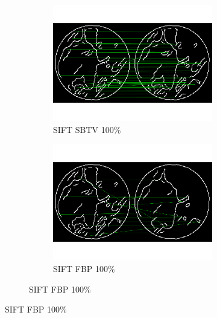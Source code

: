 \documentclass[10pt,a4paper,titlepage]{article}
\begin{document}
\begin{figure}
	\begin{figure}[H]
			\begin{subfigure}[b]{0.475\textwidth}
				\includegraphics[width=\textwidth]{Sample1/SIFT/Edges/SB/100p.png}
				\caption{SIFT SBTV 100\%}
			\end{subfigure}
			\begin{subfigure}[b]{0.475\textwidth}
				\includegraphics[width=\textwidth]{Sample1/SIFT/Edges/FBP/100p.png}
				\caption{SIFT FBP 100\%}
			\end{subfigure}
			

\end{figure}
\end{figure}
\end{document}
